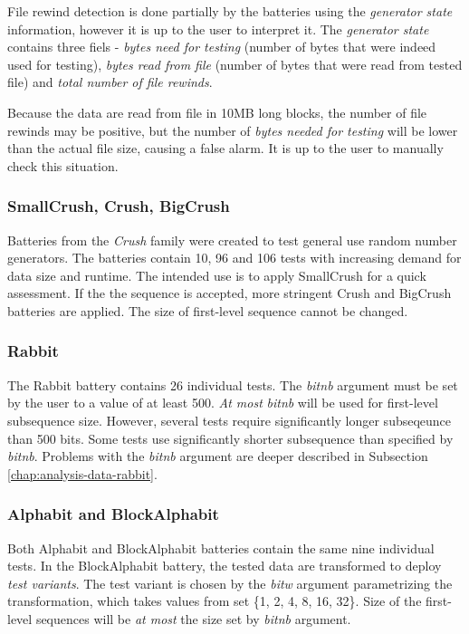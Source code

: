 \documentclass[
  digital,     %
  oneside,     %
  nosansbold,  %
  nocolorbold, %
  nolof,         %
  nolot,         %
]{fithesis4}
\begin{document}
File rewind detection is done partially by the batteries using the \emph{generator state} information, however it is up to the user to interpret it. The \emph{generator state} contains three fiels - \emph{bytes need for testing} (number of bytes that were indeed used for testing), \emph{bytes read from file} (number of bytes that were read from tested file) and \emph{total number of file rewinds}. 

Because the data are read from file in 10MB long blocks, the number of file rewinds may be positive, but the number of \emph{bytes needed for testing} will be lower than the actual file size, causing a false alarm. It is up to the user to manually check this situation. 


\subsubsection{SmallCrush, Crush, BigCrush}
Batteries from the \emph{Crush} family were created to test general use random number generators. The batteries contain 10, 96 and 106 tests with increasing demand for data size and runtime. The intended use is to apply SmallCrush for a quick assessment. If the the sequence is accepted, more stringent Crush and BigCrush batteries are applied. The size of first-level sequence cannot be changed. \cite[p. 242]{tu01_guide}

\subsubsection{Rabbit}
The Rabbit battery contains 26 individual tests. The \emph{bit\textunderscore nb} argument must be set by the user to a value of at least 500. \emph{At most} \emph{bit\textunderscore nb} will be used for first-level subsequence size. \cite[p. 152]{tu01_guide} However, several tests require significantly longer subseqeunce than 500 bits. Some tests use significantly shorter subsequence than specified by \emph{bit\textunderscore nb}. Problems with the \emph{bit\textunderscore nb} argument are deeper described in Subsection \ref{chap:analysis-data-rabbit}.

\subsubsection{Alphabit and BlockAlphabit}
Both Alphabit and BlockAlphabit batteries contain the same nine individual tests. In the BlockAlphabit battery, the tested data are transformed to deploy \emph{test variants}. The test variant is chosen by the \emph{bit\textunderscore w} argument parametrizing the transformation, which takes values from set \{1, 2, 4, 8, 16, 32\}. \cite[p. 155]{tu01_guide} Size of the first-level sequences will be \emph{at most} the size set by \emph{bit\textunderscore nb} argument.
\end{document}
